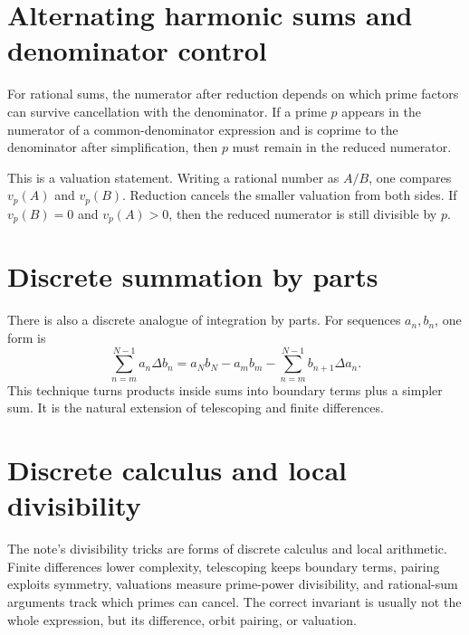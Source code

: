 \section{Alternating harmonic sums and denominator control}

For rational sums, the numerator after reduction depends on which prime factors can survive cancellation with the denominator.  If a prime \(p\) appears in the numerator of a common-denominator expression and is coprime to the denominator after simplification, then \(p\) must remain in the reduced numerator.

This is a valuation statement.  Writing a rational number as \(A/B\), one compares \(v_p(A)\) and \(v_p(B)\).  Reduction cancels the smaller valuation from both sides.  If \(v_p(B)=0\) and \(v_p(A)>0\), then the reduced numerator is still divisible by \(p\).

\section{Discrete summation by parts}

There is also a discrete analogue of integration by parts.  For sequences \(a_n,b_n\), one form is
\[
  \sum_{n=m}^{N-1}a_n\Delta b_n
  =a_Nb_N-a_mb_m-\sum_{n=m}^{N-1}b_{n+1}\Delta a_n.
\]
This technique turns products inside sums into boundary terms plus a simpler sum.  It is the natural extension of telescoping and finite differences.

\section{Discrete calculus and local divisibility}

The note's divisibility tricks are forms of discrete calculus and local arithmetic.  Finite differences lower complexity, telescoping keeps boundary terms, pairing exploits symmetry, valuations measure prime-power divisibility, and rational-sum arguments track which primes can cancel.  The correct invariant is usually not the whole expression, but its difference, orbit pairing, or valuation.
